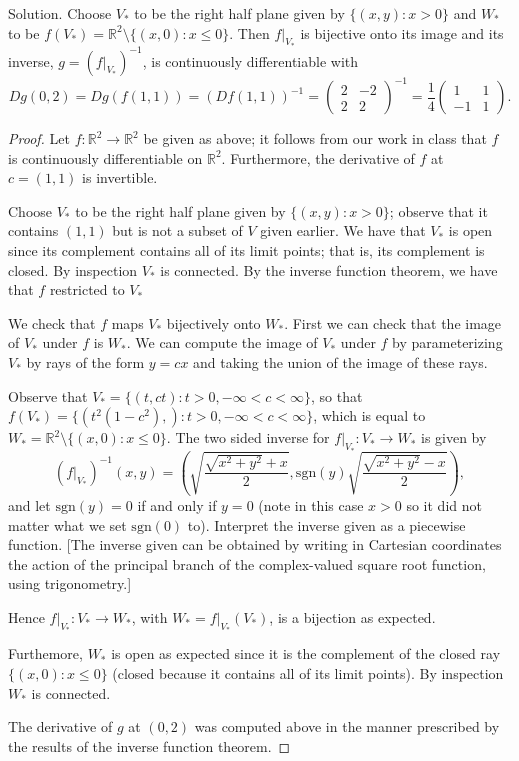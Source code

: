 \documentclass[12pt]{amsart}
\begin{document}
 Solution. Choose $V_\ast$ to be the right half plane given by $\{(x,y)\colon x>0\}$ and $W_\ast$ to be $f(V_\ast) = \mathbb{R}^2\setminus\{(x,0)\colon x\leq 0\}$. Then $f|_{V_\ast}$ is bijective onto its image and its inverse, $g = (f|_{V_\ast})^{-1}$, is continuously differentiable with \[Dg(0,2) = Dg(f(1,1)) = (Df(1,1))^{-1} = {\begin{pmatrix}
     2 & -2 \\ 2 & 2
 \end{pmatrix}}^{-1} = \frac{1}{4}\begin{pmatrix}
     1 & 1 \\ -1 & 1
 \end{pmatrix}.\] \begin{proof} Let $f\colon\mathbb{R}^2\to \mathbb{R}^2$ be given as above; it follows from our work in class that $f$ is continuously differentiable on $\mathbb{R}^2$. Furthermore, the derivative of $f$ at $c = (1,1)$ is invertible.

    Choose $V_\ast$ to be the right half plane given by $\{(x,y)\colon x>0\}$; observe that it contains $(1,1)$ but is not a subset of $V$ given earlier. We have that $V_\ast$ is open since its complement contains all of its limit points; that is, its complement is closed. By inspection $V_\ast$ is connected. By the inverse function theorem, we have that $f$ restricted to $V_\ast$ 
    
    We check that $f$ maps $V_\ast$ bijectively onto $W_\ast$. First we can check that the image of $V_\ast$ under $f$ is $W_\ast$. We can compute the image of $V_\ast$ under $f$ by parameterizing $V_\ast$ by rays of the form $y = cx$ and taking the union of the image of these rays.

    Observe that $V_\ast = \{(t,ct)\colon t>0, -\infty<c<\infty\}$, so that $f(V_\ast) = \{(t^2(1-c^2),)\colon t>0, -\infty<c<\infty\}$, which is equal to $W_\ast = \mathbb{R}^2\setminus\{(x,0)\colon x\leq 0\}$. The two sided inverse for $f|_{V_\ast}\colon V_\ast\to W_\ast$ is given by \[(f|_{V_\ast})^{-1}(x,y) = \left(\sqrt{\frac{\sqrt{x^2+y^2} + x}{2}}, \mathrm{sgn}(y)\sqrt{\frac{\sqrt{x^2+y^2}-x}{2}}\right),\] and let $\mathrm{sgn}(y) = 0$ if and only if $y = 0$ (note in this case $x>0$ so it did not matter what we set $\mathrm{sgn}(0)$ to). Interpret the inverse given as a piecewise function. [The inverse given can be obtained by writing in Cartesian coordinates the action of the principal branch of the complex-valued square root function, using trigonometry.]
    
    Hence $f|_{V_\ast}\colon V_\ast\to W_\ast$, with $W_\ast = f|_{V_\ast}(V_\ast)$, is a bijection as expected. 

    Furthemore, $W_\ast$ is open as expected since it is the complement of the closed ray $\{(x,0)\colon x\leq 0\}$ (closed because it contains all of its limit points). By inspection $W_\ast$ is connected.

    The derivative of $g$ at $(0,2)$ was computed above in the manner prescribed by the results of the inverse function theorem.
 \end{proof}
\end{document}
